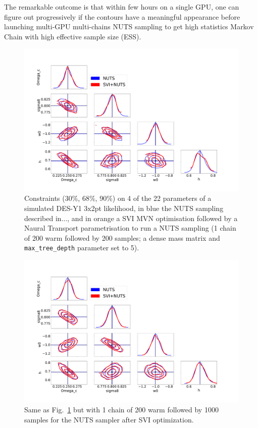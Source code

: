 \documentclass[final,5p,times,twocolumn,authoryear]{elsarticle}
\begin{document}
The remarkable outcome is that within few hours on a single GPU, one can figure out progressively if the contours have a meaningful appearance before launching multi-GPU multi-chains NUTS sampling to get high statistics Markov Chain with high effective sample size (ESS). 

\begin{figure}
\includegraphics[width=\columnwidth]{figures/SVI_NUTS_1x200x200.pdf}
\caption{Constraints (30\%, 68\%, 90\%) on 4 of the 22 parameters of a simulated DES-Y1 3x2pt likelihood, in blue the NUTS sampling described in..., and in orange a SVI MVN optimisation followed by a Naural Transport parametrisation to run a NUTS sampling (1 chain of 200 warm followed by 200 samples; a dense mass matrix and \texttt{max\_tree\_depth} parameter set to 5).}
\label{fig_svi_nuts_1}
\end{figure}

\begin{figure}
\includegraphics[width=\columnwidth]{figures/SVI_NUTS_1x200x1000.pdf}
\caption{Same as Fig.~\ref{fig_svi_nuts_1} but with 1 chain of 200 warm followed by 1000 samples for the NUTS sampler after SVI optimization.}
\label{fig_svi_nuts_2}
\end{figure}
\end{document}
